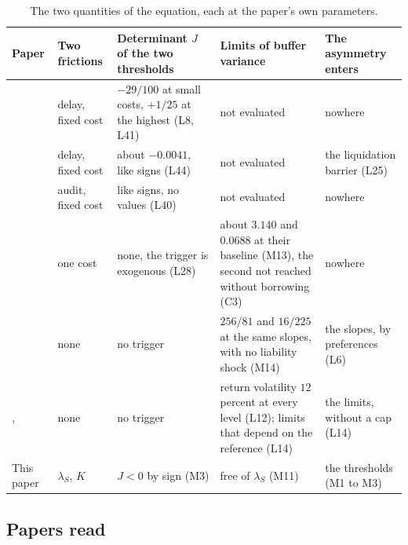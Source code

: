 \begin{table}[H]
\footnotesize
\caption{The two quantities of the equation, each at the paper's own parameters.}\label{tab:common-values}
\begin{tabular}{@{}P{3.0cm}P{2.4cm}P{4.0cm}P{3.6cm}P{2.6cm}@{}}
\toprule
Paper & Two frictions & Determinant $J$ of the two thresholds & Limits of buffer variance & The asymmetry enters \\
\midrule
\citet{peura2006} & delay, fixed cost & $-29/100$ at small costs, $+1/25$ at the highest (L8, L41) & not evaluated & nowhere \\ \addlinespace
\citet{daihuangkeppo2019} & delay, fixed cost & about $-0.0041$, like signs (L44) & not evaluated & the liquidation barrier (L25) \\ \addlinespace
\citet{milnewhalley2001} & audit, fixed cost & like signs, no values (L40) & not evaluated & nowhere \\ \addlinespace
\citet{bayraktar2026} & one cost & none, the trigger is exogenous (L28) & about $3.140$ and $0.0688$ at their baseline (M13), the second not reached without borrowing (C3) & nowhere \\ \addlinespace
\citet{blackperold1992} & none & no trigger & $256/81$ and $16/225$ at the same slopes, with no liability shock (M14) & the slopes, by preferences (L6) \\ \addlinespace
\citet{barberis2001}, \citet{li2023} & none & no trigger & return volatility $12$ percent at every level (L12); limits that depend on the reference (L14) & the limits, without a cap (L14) \\ \addlinespace
This paper & $\lambda_S$, $K$ & $J<0$ by sign (M3) & free of $\lambda_S$ (M11) & the thresholds (M1 to M3) \\
\bottomrule
\end{tabular}
\end{table}

\subsection{Papers read}

